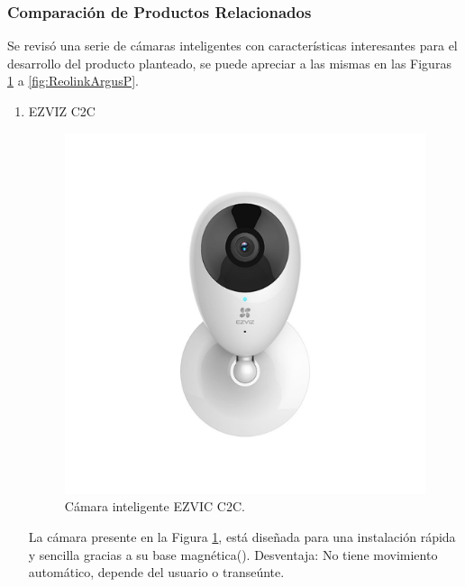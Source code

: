 \needspace{4cm}
\subsubsection{Comparación de Productos Relacionados}
Se revisó una serie de cámaras inteligentes con características interesantes para el desarrollo del producto planteado, se puede apreciar a las mismas en las Figuras \ref{fig:EZVIC_C2C} a \ref{fig:ReolinkArgusP}.

\begin{enumerate}[label=\alph*)]
    \needspace{3cm}
    \item EZVIZ C2C
    
    \begin{figure}[H]
    \centering
    \begin{adjustbox}{width=\linewidth/2}
      \includegraphics{media/ezvic_c2c.jpeg}
    \end{adjustbox}
    \caption{\label{fig:EZVIC_C2C}Cámara inteligente EZVIC C2C.}
    \end{figure}
    
    La cámara presente en la Figura \ref{fig:EZVIC_C2C}, está diseñada para una instalación rápida y sencilla gracias a su base magnética(\cite{EZVIZ}). Desventaja: No tiene movimiento automático, depende del usuario o transeúnte.


\end{enumerate}

